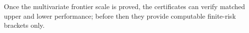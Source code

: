 Once the multivariate frontier scale is proved, the certificates can verify matched upper and lower performance; before then they provide computable finite-risk brackets only.
